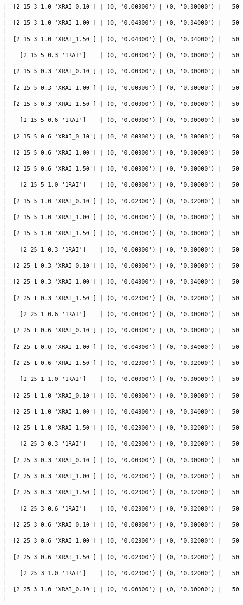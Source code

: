 \documentclass{article}
\begin{document}
\begin{verbatim}
|  [2 15 3 1.0 'XRAI_0.10'] | (0, '0.00000') | (0, '0.00000') |   50  |
|  [2 15 3 1.0 'XRAI_1.00'] | (0, '0.04000') | (0, '0.04000') |   50  |
|  [2 15 3 1.0 'XRAI_1.50'] | (0, '0.04000') | (0, '0.04000') |   50  |
|    [2 15 5 0.3 '1RAI']    | (0, '0.00000') | (0, '0.00000') |   50  |
|  [2 15 5 0.3 'XRAI_0.10'] | (0, '0.00000') | (0, '0.00000') |   50  |
|  [2 15 5 0.3 'XRAI_1.00'] | (0, '0.00000') | (0, '0.00000') |   50  |
|  [2 15 5 0.3 'XRAI_1.50'] | (0, '0.00000') | (0, '0.00000') |   50  |
|    [2 15 5 0.6 '1RAI']    | (0, '0.00000') | (0, '0.00000') |   50  |
|  [2 15 5 0.6 'XRAI_0.10'] | (0, '0.00000') | (0, '0.00000') |   50  |
|  [2 15 5 0.6 'XRAI_1.00'] | (0, '0.00000') | (0, '0.00000') |   50  |
|  [2 15 5 0.6 'XRAI_1.50'] | (0, '0.00000') | (0, '0.00000') |   50  |
|    [2 15 5 1.0 '1RAI']    | (0, '0.00000') | (0, '0.00000') |   50  |
|  [2 15 5 1.0 'XRAI_0.10'] | (0, '0.02000') | (0, '0.02000') |   50  |
|  [2 15 5 1.0 'XRAI_1.00'] | (0, '0.00000') | (0, '0.00000') |   50  |
|  [2 15 5 1.0 'XRAI_1.50'] | (0, '0.00000') | (0, '0.00000') |   50  |
|    [2 25 1 0.3 '1RAI']    | (0, '0.00000') | (0, '0.00000') |   50  |
|  [2 25 1 0.3 'XRAI_0.10'] | (0, '0.00000') | (0, '0.00000') |   50  |
|  [2 25 1 0.3 'XRAI_1.00'] | (0, '0.04000') | (0, '0.04000') |   50  |
|  [2 25 1 0.3 'XRAI_1.50'] | (0, '0.02000') | (0, '0.02000') |   50  |
|    [2 25 1 0.6 '1RAI']    | (0, '0.00000') | (0, '0.00000') |   50  |
|  [2 25 1 0.6 'XRAI_0.10'] | (0, '0.00000') | (0, '0.00000') |   50  |
|  [2 25 1 0.6 'XRAI_1.00'] | (0, '0.04000') | (0, '0.04000') |   50  |
|  [2 25 1 0.6 'XRAI_1.50'] | (0, '0.02000') | (0, '0.02000') |   50  |
|    [2 25 1 1.0 '1RAI']    | (0, '0.00000') | (0, '0.00000') |   50  |
|  [2 25 1 1.0 'XRAI_0.10'] | (0, '0.00000') | (0, '0.00000') |   50  |
|  [2 25 1 1.0 'XRAI_1.00'] | (0, '0.04000') | (0, '0.04000') |   50  |
|  [2 25 1 1.0 'XRAI_1.50'] | (0, '0.02000') | (0, '0.02000') |   50  |
|    [2 25 3 0.3 '1RAI']    | (0, '0.02000') | (0, '0.02000') |   50  |
|  [2 25 3 0.3 'XRAI_0.10'] | (0, '0.00000') | (0, '0.00000') |   50  |
|  [2 25 3 0.3 'XRAI_1.00'] | (0, '0.02000') | (0, '0.02000') |   50  |
|  [2 25 3 0.3 'XRAI_1.50'] | (0, '0.02000') | (0, '0.02000') |   50  |
|    [2 25 3 0.6 '1RAI']    | (0, '0.02000') | (0, '0.02000') |   50  |
|  [2 25 3 0.6 'XRAI_0.10'] | (0, '0.00000') | (0, '0.00000') |   50  |
|  [2 25 3 0.6 'XRAI_1.00'] | (0, '0.02000') | (0, '0.02000') |   50  |
|  [2 25 3 0.6 'XRAI_1.50'] | (0, '0.02000') | (0, '0.02000') |   50  |
|    [2 25 3 1.0 '1RAI']    | (0, '0.02000') | (0, '0.02000') |   50  |
|  [2 25 3 1.0 'XRAI_0.10'] | (0, '0.00000') | (0, '0.00000') |   50  |

\end{verbatim}
\end{document}
